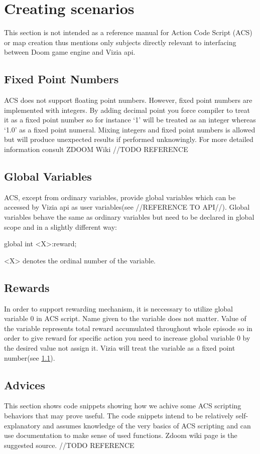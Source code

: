\section{Creating scenarios}\label{sec:creating_scenarios}
	This section is not intended as a reference manual for Action Code Script (ACS) or map creation thus mentions only subjects directly relevant to interfacing between Doom game engine and Vizia api.


	\subsection{Fixed Point Numbers}\label{subsec:fixed_point}
		ACS does not support floating point numbers. However, fixed point numbers are implemented with integers. By adding decimal point you force compiler to treat it as a fixed point number so for instance `1' will be treated as an integer whereas `1.0' as a fixed point numeral. Mixing integers and fixed point numbers is allowed but will produce unexpected results if performed unknowingly. For more detailed information consult ZDOOM Wiki //TODO REFERENCE

	\subsection{Global Variables}\label{subsec:global_variable}
		ACS, except from ordinary variables, provide global variables which can be accessed by Vizia api as user variables(see //REFERENCE TO API//). Global variables behave the same as ordinary variables but need to be declared in global scope and in a slightly different way:
		\begin{clinee}
global int <X>:reward;
		\end{clinee}
		<X> denotes the ordinal number of the variable.
		
	\subsection{Rewards}
		In order to support rewarding mechanism, it is neccessary to utilize global variable 0 in ACS script. Name given to the variable does not matter. Value of the variable represents total reward accumulated throughout whole episode so in order to give reward for specific action you need to increase global variable 0 by the desired value not assign it. Vizia will treat the variable as a fixed point number(see \ref{subsec:fixed_point}).

	\subsection{Advices}
		This section shows code snippets showing how we achive some ACS scripting behaviors that may prove useful. The code snippets intend to be relatively self-explanatory and assumes knowledge of the very basics of ACS scripting and can use documentation to make sense of used functions. Zdoom wiki page is the suggested source. //TODO REFERENCE

